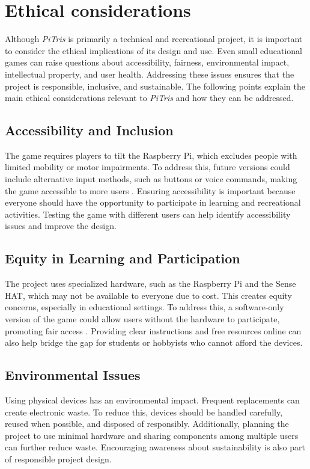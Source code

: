 \documentclass[11pt,titlepage,openright]{book}
\begin{document}
\chapter{Ethical considerations}
Although \textit{PiTris} is primarily a technical and recreational project, it is important to consider the ethical implications of its design and use. Even small educational games can raise questions about accessibility, fairness, environmental impact, intellectual property, and user health. Addressing these issues ensures that the project is responsible, inclusive, and sustainable. The following points explain the main ethical considerations relevant to \textit{PiTris} and how they can be addressed.

\section{Accessibility and Inclusion}
The game requires players to tilt the Raspberry Pi, which excludes people with limited mobility or motor impairments. To address this, future versions could include alternative input methods, such as buttons or voice commands, making the game accessible to more users \cite{Seale2014}. Ensuring accessibility is important because everyone should have the opportunity to participate in learning and recreational activities. Testing the game with different users can help identify accessibility issues and improve the design.

\section{Equity in Learning and Participation}
The project uses specialized hardware, such as the Raspberry Pi and the Sense HAT, which may not be available to everyone due to cost. This creates equity concerns, especially in educational settings. To address this, a software-only version of the game could allow users without the hardware to participate, promoting fair access \cite{Binns2018}. Providing clear instructions and free resources online can also help bridge the gap for students or hobbyists who cannot afford the devices.

\section{Environmental Issues}
Using physical devices has an environmental impact. Frequent replacements can create electronic waste. To reduce this, devices should be handled carefully, reused when possible, and disposed of responsibly. Additionally, planning the project to use minimal hardware and sharing components among multiple users can further reduce waste. Encouraging awareness about sustainability is also part of responsible project design.
\end{document}
